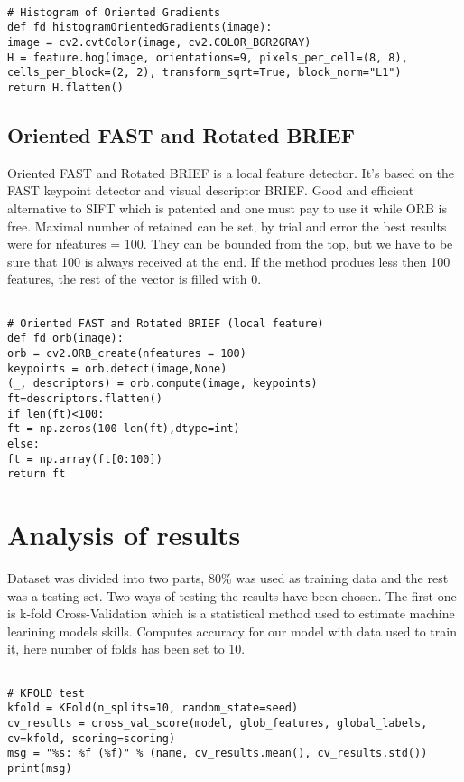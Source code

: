 \documentclass{article}
\begin{document}
\begin{verbatim}

# Histogram of Oriented Gradients
def fd_histogramOrientedGradients(image):
image = cv2.cvtColor(image, cv2.COLOR_BGR2GRAY)
H = feature.hog(image, orientations=9, pixels_per_cell=(8, 8),
cells_per_block=(2, 2), transform_sqrt=True, block_norm="L1")
return H.flatten()

\end{verbatim}

\subsection{Oriented FAST and Rotated BRIEF}

Oriented FAST and Rotated BRIEF is a local feature detector. It's based on the FAST keypoint detector and visual descriptor BRIEF. Good and efficient alternative to SIFT which is patented and one must pay to use it while ORB is free. Maximal number of retained can be set, by trial and error the best results were for nfeatures = 100. They can be bounded from the top, but we have to be sure that 100 is always received at the end. If the method produes less then 100 features, the rest of the vector is filled with 0.

\begin{verbatim}

# Oriented FAST and Rotated BRIEF (local feature)
def fd_orb(image):
orb = cv2.ORB_create(nfeatures = 100)
keypoints = orb.detect(image,None)
(_, descriptors) = orb.compute(image, keypoints)
ft=descriptors.flatten()
if len(ft)<100:
ft = np.zeros(100-len(ft),dtype=int)
else:
ft = np.array(ft[0:100])
return ft

\end{verbatim}

\section{Analysis of results}

Dataset was divided into two parts, 80\% was used as training data and the rest was a testing set. Two ways of testing the results have been chosen. The first one is k-fold Cross-Validation which is a statistical method used to estimate machine learining models skills. Computes accuracy for our model with data used to train it, here number of folds has been set to 10.

\begin{verbatim}

# KFOLD test
kfold = KFold(n_splits=10, random_state=seed)
cv_results = cross_val_score(model, glob_features, global_labels, cv=kfold, scoring=scoring)
msg = "%s: %f (%f)" % (name, cv_results.mean(), cv_results.std())
print(msg)

\end{verbatim}
\end{document}
